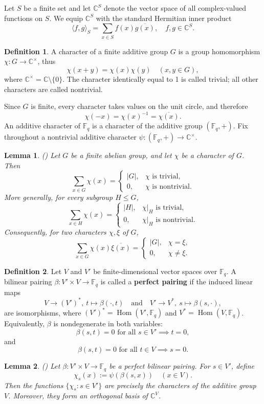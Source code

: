 \documentclass[11pt]{article}
\newtheorem{lemma}{Lemma}
\theoremstyle{definition}
\newtheorem{definition}{Definition}
\newcommand{\Fq}{\mathbb F_q}
\newcommand{\Hom}{\operatorname{Hom}}
\begin{document}
Let $S$ be a finite set and let $\mathbb{C}^S$ denote the vector space of all complex-valued functions on $S$. We equip $\mathbb{C}^S$ with the standard Hermitian inner product 
\[
    \langle f,g\rangle_S=\sum\limits_{x\in S}f(x)\overline{g(x)}, \quad f,g\in \mathbb{C}^S.
\]
\begin{definition}
A character of a finite additive group $G$ is a group homomorphism $\chi : G \to \mathbb{C}^\times$, thus  
\[\chi(x + y) = \chi(x)\chi(y) \quad (x, y \in G),\]
where $\mathbb{C}^\times=\mathbb{C}\setminus\{0\}$. The character identically equal to 1 is called trivial; all other characters are called nontrivial. 
\end{definition}
Since $G$ is finite, every character takes values on the unit circle, and therefore  
\[\chi(-x) = \chi(x)^{-1} = \overline{\chi(x)}.\]
An additive character of $\Fq$ is a character of the additive group $(\Fq,+)$. Fix throughout a nontrivial additive character $\psi : (\Fq,+) \to \mathbb{C}^\times$. 
\begin{lemma}\label{lem: character sum}(\cite{Lidl})
Let $G$ be a finite abelian group, and let $\chi$ be a character of $G$. Then
\[\sum_{x \in G} \chi(x) = 
\begin{cases} 
|G|, & \chi \text{ is trivial,} \\
0, & \chi \text{ is nontrivial.}
\end{cases}
\]
More generally, for every subgroup $H \leq G$,
\[\sum_{x \in H} \chi(x) = 
\begin{cases} 
|H|, & \chi|_H \text{ is trivial,} \\
0, & \chi|_H \text{ is nontrivial.}
\end{cases}
\]
Consequently, for two characters $\chi, \xi$ of $G$,
\[\sum_{x \in G} \chi(x) \overline{\xi(x)} = 
\begin{cases} 
|G|, & \chi = \xi, \\
0, & \chi \neq \xi.
\end{cases}
\]
\end{lemma}
\begin{definition}
Let $V$ and $V'$ be finite-dimensional vector spaces over $\Fq$. A bilinear pairing $\beta : V' \times V \to \Fq$ is called a \textbf{perfect pairing} if the induced linear maps
\[V \to (V')^*, \ t \mapsto \beta(\cdot,t) \quad \text{and} \quad V' \to V^*, \ s \mapsto \beta(s, \cdot),\]
are isomorphisms, where $(V')^*=\Hom(V',\Fq)$ and $V^*=\Hom(V,\Fq)$. Equivalently, $\beta$ is nondegenerate in both variables: 
\[\beta(s, t) = 0 \text{ for all } s \in V' \implies t = 0,\]
and
\[\beta(s, t) = 0 \text{ for all } t \in V \implies s = 0.\]
\end{definition}
\begin{lemma}\label{lem:perfect pairing}(\cite{Ceccherini2008})
Let $\beta : V' \times V \to \Fq$ be a perfect bilinear pairing. For $s\in V'$, define
\[\chi_s(x) := \psi(\beta(s, x)) \quad (x\in V).\]
Then the functions $\{\chi_s : s \in V'\}$ are precisely the characters of the additive group $V$. Moreover, they form an orthogonal basis of $\mathbb{C}^V$.
\end{lemma}
\end{document}
